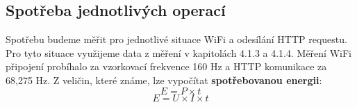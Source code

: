 \documentclass[a4paper, 12pt]{report}
\begin{document}

			\subsection{Spotřeba jednotlivých operací}
				Spotřebu budeme měřit pro jednotlivé situace WiFi a odesílání HTTP requestu. Pro tyto situace využijeme data z měření v kapitolách 4.1.3 a 4.1.4. Měření WiFi připojení probíhalo za vzorkovací frekvence 160 Hz a HTTP komunikace za 68,275 Hz. Z veličin, které známe, lze vypočítat \textbf{spotřebovanou energii}:
				$$E = P \times t$$
				$$E = U \times I \times t$$
\end{document}
